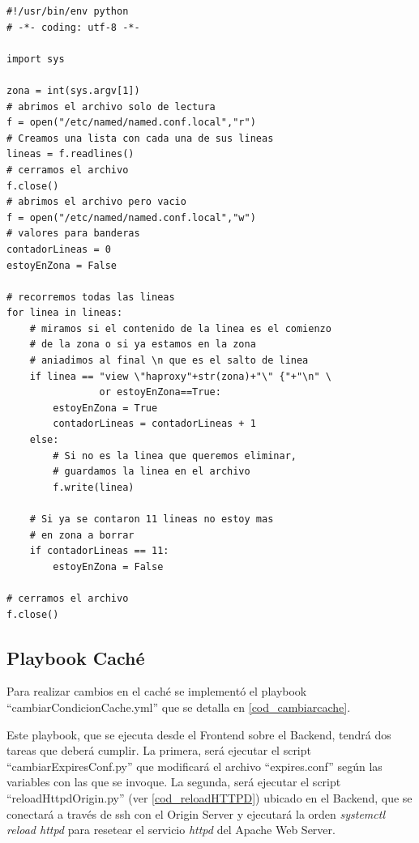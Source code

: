 \documentclass[12pt,a4paper,oneside]{book}
\begin{document}
\vspace{0,5cm}

\begin{lstlisting}[style=codigobase,  caption= eliminarZona.py, label=cod_eliminarZona]
#!/usr/bin/env python
# -*- coding: utf-8 -*-
 
import sys 

zona = int(sys.argv[1])
# abrimos el archivo solo de lectura
f = open("/etc/named/named.conf.local","r")
# Creamos una lista con cada una de sus lineas
lineas = f.readlines()
# cerramos el archivo
f.close()
# abrimos el archivo pero vacio
f = open("/etc/named/named.conf.local","w")
# valores para banderas
contadorLineas = 0
estoyEnZona = False

# recorremos todas las lineas
for linea in lineas:
    # miramos si el contenido de la linea es el comienzo
    # de la zona o si ya estamos en la zona
    # aniadimos al final \n que es el salto de linea
    if linea == "view \"haproxy"+str(zona)+"\" {"+"\n" \
                or estoyEnZona==True:
        estoyEnZona = True
        contadorLineas = contadorLineas + 1
    else:
        # Si no es la linea que queremos eliminar,
        # guardamos la linea en el archivo
        f.write(linea)
	
    # Si ya se contaron 11 lineas no estoy mas
    # en zona a borrar
    if contadorLineas == 11:
        estoyEnZona = False

# cerramos el archivo
f.close()
\end{lstlisting}

\vspace{0.5cm}

\subsection{Playbook Caché}
\label{subseccC.5.3}
Para realizar cambios en el caché se implementó el playbook ``cambiarCondicionCache.yml'' que se detalla en \ref{cod_cambiarcache}.

\vspace{0.5cm}

Este playbook, que se ejecuta desde el Frontend sobre el Backend, tendrá dos tareas que deberá cumplir. La primera, será ejecutar el script ``cambiarExpiresConf.py'' que modificará el archivo ``expires.conf'' según las variables con las que se invoque. La segunda, será ejecutar el script ``reloadHttpdOrigin.py'' (ver \ref{cod_reloadHTTPD}) ubicado en el Backend, que  se conectará a través de ssh con el Origin Server y ejecutará la orden \textit{systemctl reload httpd} para resetear el servicio \textit{httpd} del Apache Web Server.
\end{document}
